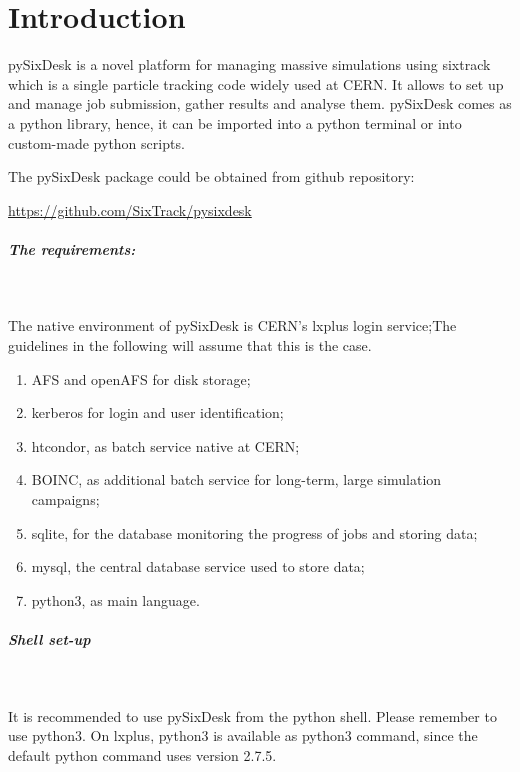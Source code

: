 
\chapter{Introduction} \label{Intro}

pySixDesk is a novel platform for managing massive simulations using sixtrack  which is a single particle tracking code widely used at CERN. It allows to set up and manage job submission, gather results and analyse them. pySixDesk comes as a python library, hence, it can be imported into a python terminal or into custom-made python scripts.

The pySixDesk package could be obtained from github repository:

\url{https://github.com/SixTrack/pysixdesk}


\paragraph{The requirements:}~

The native environment of pySixDesk is CERN's lxplus login service;The guidelines in the following will assume that this is the case.
\begin{enumerate}
    \item AFS and openAFS for disk storage;
    \item kerberos for login and user identification;
    \item htcondor, as batch service native at CERN;
    \item BOINC, as additional batch service for long-term, large simulation campaigns;
    \item sqlite, for the database monitoring the progress of jobs and storing data;
    \item mysql, the central database service used to store data;
    \item python3, as main language.
\end{enumerate}


\paragraph{Shell set-up}~

It is recommended to use pySixDesk from the python shell. Please remember to use python3. On lxplus, python3 is available as python3 command, since the default python command uses version 2.7.5.

